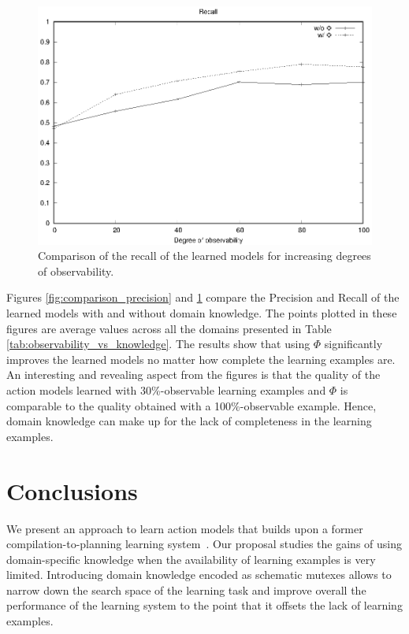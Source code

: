 \documentclass{article}
\begin{document}
\begin{figure}[hbt!]
	\centering
	\includegraphics[width=\linewidth]{figures/comparison_recall.eps}
	\caption{Comparison of the recall of the learned models for increasing degrees of observability.}
	\label{fig:comparison_recall}
\end{figure}

Figures \ref{fig:comparison_precision} and \ref{fig:comparison_recall} compare the Precision and Recall of the learned models with and without domain knowledge. The points plotted in these figures are average values across all the domains presented in Table \ref{tab:observability_vs_knowledge}. The results show that using $\Phi$ significantly improves the learned models no matter how complete the learning examples are. An interesting and revealing aspect from the figures is that the quality of the action models learned with 30\%-observable learning examples and $\Phi$ is comparable to the quality obtained with a 100\%-observable example. Hence, domain knowledge can make up for the lack of completeness in the learning examples.



\section{Conclusions}
\label{sec:conclusions}

We present an approach to learn action models that builds upon a former compilation-to-planning learning system~\cite{aineto2018learning}. Our proposal studies the gains of using domain-specific knowledge when the availability of learning examples is very limited. Introducing domain knowledge encoded as schematic mutexes allows to narrow down the search space of the learning task and improve overall the performance of the learning system to the point that it offsets the lack of learning examples.
\end{document}
